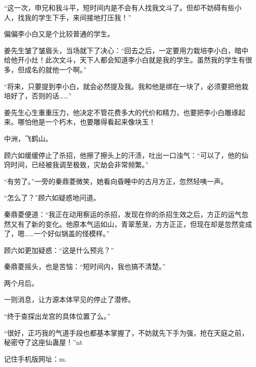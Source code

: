 \begin{this_body}
“这一次，申兄和我斗平，短时间内是不会有人找我文斗了。但却不妨碍有些小人，找我的学生下手，来间接地打压我！”

偏偏李小白又是个比较普通的学生。

姜先生皱了皱眉头，当场就下了决心：“回去之后，一定要用力栽培李小白，暗中给他开小灶！此次文斗，天下人都会知道李小白就是我的学生。虽然我的学生有很多，但成名的就他一个啊。”

“将来，只要提到李小白，就会必然提及我。我和他是绑在一块了，必须要把他栽培好了，否则的话……”

姜先生心生重重压力，他决定不管花费多大的代价和精力，也要把李小白雕琢起来。哪怕他是一个朽木，也要雕得看起来像块玉！

中洲，飞鹤山。

顾六如缓缓停止了杀招，他擦了擦头上的汗渍，吐出一口浊气：“可以了，他的仙窍时间，已经被我调至极致，灾劫会非常频繁。”

“有劳了。”一旁的秦鼎菱微笑，她看向昏睡中的古月方正，忽然轻咦一声。

“怎么了？”顾六如疑惑地问道。

秦鼎菱便道：“我正在动用察运的杀招，发现在你的杀招生效之后，方正的运气忽然又有了新的变化。他原本气运如山，青翠葱茏，方方正正，但现在却是忽然变成了，嗯……一个好似锅盖的怪模样。”

顾六如更加疑惑：“这是什么预兆？”

秦鼎菱摇头，也是苦恼：“短时间内，我也搞不清楚。”

两个月后。

一则消息，让方源本体罕见的停止了潜修。

“终于查探出龙宫的具体位置了么。”

“很好，正巧我的气道手段也都基本掌握了，不妨就先下手为强，抢在天庭之前，秘密夺了这座仙蛊屋！”nt

记住手机版网址：m.

\end{this_body}

